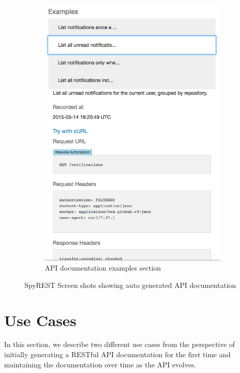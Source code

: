 \documentclass[conference]{IEEEtran}
\begin{document}
\begin{figure}[!tbh]
\begin{subfigure}[t]{0.5\textwidth}
    \includegraphics[width=\linewidth]{examples.png}
    \caption{API documentation examples section}
    \label{fig:examples}
  \end{subfigure}
  \caption{SpyREST Screen shots showing auto generated API documentation}
  \label{fig:spyrest_screenshots}
\end{figure}

\section{Use Cases}
In this section, we describe two different use cases from the perspective of initially generating a RESTful API documentation for the first time and maintaining the documentation over time as the API evolves.
\end{document}
